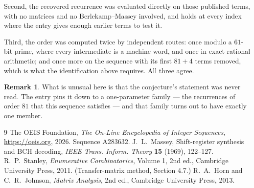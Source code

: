 \documentclass[11pt,a4paper]{article}
\theoremstyle{plain}
\theoremstyle{definition}
\newtheorem{remark}[theorem]{Remark}
\begin{document}
Second, the recovered recurrence was evaluated directly on those published terms, with no
matrices and no Berlekamp--Massey involved, and holds at every index where the entry gives
enough earlier terms to test it.

Third, the order was computed twice by independent routes: once modulo a $61$-bit prime, where
every intermediate is a machine word, and once in exact rational arithmetic; and once more on
the sequence with its first $81+4$ terms removed, which is what the identification above
requires. All three agree.

\begin{remark}
What is unusual here is that the conjecture's statement was never read. The entry pins it down
to a one-parameter family --- the recurrences of order $81$ that this sequence satisfies
--- and that family turns out to have exactly one member.
\end{remark}

\begin{thebibliography}{9}
 The OEIS Foundation, \emph{The On-Line Encyclopedia of Integer
Sequences}, \url{https://oeis.org}, 2026. Sequence A283632.
 J.~L.~Massey, Shift-register synthesis and BCH decoding, \emph{IEEE
Trans. Inform. Theory} \textbf{15} (1969), 122--127.
 R.~P.~Stanley, \emph{Enumerative Combinatorics}, Volume 1, 2nd ed.,
Cambridge University Press, 2011. (Transfer-matrix method, Section 4.7.)
 R.~A.~Horn and C.~R.~Johnson, \emph{Matrix Analysis}, 2nd ed., Cambridge
University Press, 2013.
\end{thebibliography}
\end{document}
